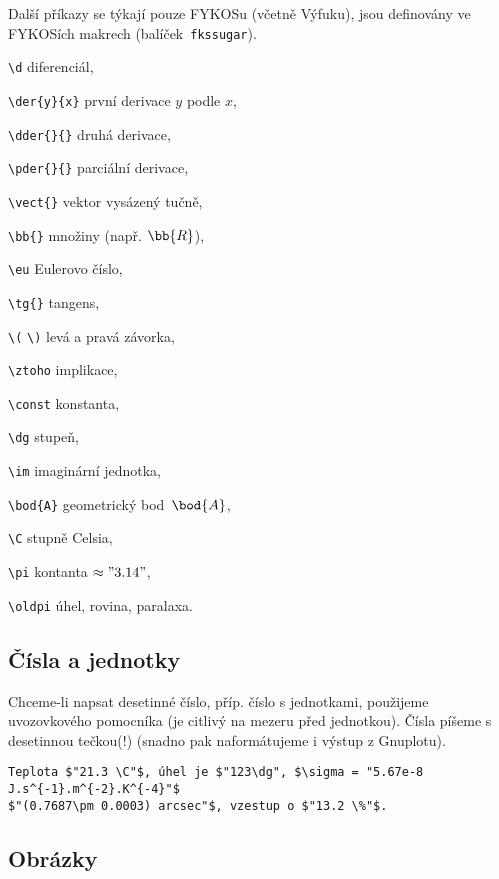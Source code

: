 \documentclass[fykos]{fksbase} %
\begin{document}
\newpage
Další příkazy se týkají pouze FYKOSu (včetně Výfuku), jsou definovány ve FYKOSích makrech
(balíček~\verb|fkssugar|).\nopagebreak
\begin{multicols}{2}
\begin{compactitem}
    \item \verb|\d| diferenciál,
    \item \verb|\der{y}{x}| první derivace $y$ podle $x$,
    \item \verb|\dder{}{}| druhá derivace,
    \item \verb|\pder{}{}| parciální derivace,
    \item \verb|\vect{}| vektor vysázený tučně,
    \item \verb|\bb{}| množiny (např. $\bb{R}$),
    \item \verb|\eu| Eulerovo číslo,
    \item \verb|\tg{}| tangens,
    \item \verb|\(| \verb|\)| levá a pravá závorka,
    \item \verb|\ztoho| implikace,
    \item \verb|\const| konstanta,
    \item \verb|\dg| stupeň,
    \item \verb|\im| imaginární jednotka,
    \item \verb|\bod{A}| geometrický bod~$\bod{A}$,
    \item \verb|\C| stupně Celsia,
    \item \verb|\pi| kontanta $\approx "3.14"$,
    \item \verb|\oldpi| úhel, rovina, paralaxa.
\end{compactitem}
\end{multicols}

\subsection{Čísla a jednotky}

Chceme-li napsat desetinné číslo, příp. číslo s jednotkami, použijeme uvozovkového
pomocníka (je citlivý na mezeru před jednotkou). Čísla píšeme s desetinnou
tečkou(!) (snadno pak naformátujeme i výstup z Gnuplotu).

\begin{verbatim}
Teplota $"21.3 \C"$, úhel je $"123\dg", $\sigma = "5.67e-8 J.s^{-1}.m^{-2}.K^{-4}"$
$"(0.7687\pm 0.0003) arcsec"$, vzestup o $"13.2 \%"$.
\end{verbatim}


\subsection{Obrázky}
\end{document}
